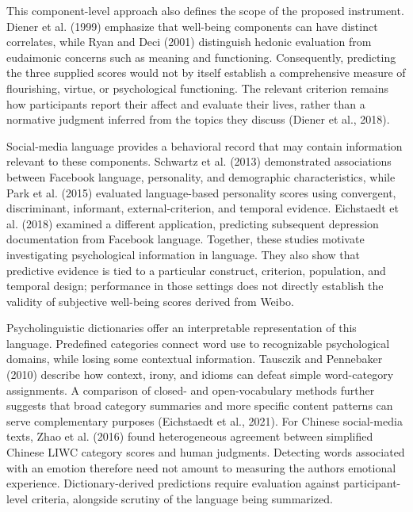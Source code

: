 \documentclass[11pt,letterpaper]{article}
\begin{document}
This component-level approach also defines the scope of the proposed instrument. Diener et al. (1999) emphasize that well-being components can have distinct correlates, while Ryan and Deci (2001) distinguish hedonic evaluation from eudaimonic concerns such as meaning and functioning. Consequently, predicting the three supplied scores would not by itself establish a comprehensive measure of flourishing, virtue, or psychological functioning. The relevant criterion remains how participants report their affect and evaluate their lives, rather than a normative judgment inferred from the topics they discuss (Diener et al., 2018).

Social-media language provides a behavioral record that may contain information relevant to these components. Schwartz et al. (2013) demonstrated associations between Facebook language, personality, and demographic characteristics, while Park et al. (2015) evaluated language-based personality scores using convergent, discriminant, informant, external-criterion, and temporal evidence. Eichstaedt et al. (2018) examined a different application, predicting subsequent depression documentation from Facebook language. Together, these studies motivate investigating psychological information in language. They also show that predictive evidence is tied to a particular construct, criterion, population, and temporal design; performance in those settings does not directly establish the validity of subjective well-being scores derived from Weibo.

Psycholinguistic dictionaries offer an interpretable representation of this language. Predefined categories connect word use to recognizable psychological domains, while losing some contextual information. Tausczik and Pennebaker (2010) describe how context, irony, and idioms can defeat simple word-category assignments. A comparison of closed- and open-vocabulary methods further suggests that broad category summaries and more specific content patterns can serve complementary purposes (Eichstaedt et al., 2021). For Chinese social-media texts, Zhao et al. (2016) found heterogeneous agreement between simplified Chinese LIWC category scores and human judgments. Detecting words associated with an emotion therefore need not amount to measuring the author\textquotesingle s emotional experience. Dictionary-derived predictions require evaluation against participant-level criteria, alongside scrutiny of the language being summarized.
\end{document}
